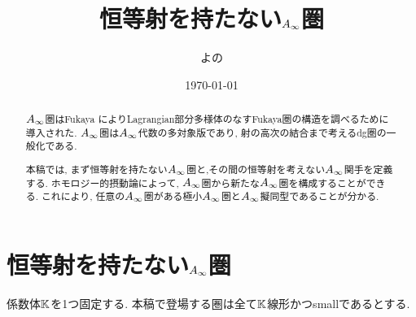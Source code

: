 \documentclass[uplatex, a4paper, 14Q, dvipdfmx]{jsarticle}
\title{恒等射を持たない\texorpdfstring{$A_{\infty}$}{Ainf}圏}
\author{よの}
\date{\today}
\begin{document}
\maketitle

\begin{abstract}
  $A_{\infty}$圏はFukaya \cite{Fuk93}\cite{Fuk96}によりLagrangian部分多様体のなすFukaya圏の構造を調べるために導入された. 
  $A_{\infty}$圏は$A_{\infty}$代数の多対象版であり, 射の高次の結合まで考えるdg圏の一般化である. 




  本稿では, まず恒等射を持たない$A_{\infty}$圏と,その間の恒等射を考えない$A_{\infty}$関手を定義する. 
  ホモロジー的摂動論によって, $A_{\infty}$圏から新たな$A_{\infty}$圏を構成することができる. 
  これにより, 任意の$A_{\infty}$圏がある極小$A_{\infty}$圏と$A_{\infty}$擬同型であることが分かる. 

\end{abstract}

\tableofcontents

\section{恒等射を持たない\texorpdfstring{$A_{\infty}$}{Ainf}圏} \label{section_non_unital_Ainf_cat}

係数体$\mathbb{K}$を1つ固定する. 
本稿で登場する圏は全て$\mathbb{K}$線形かつsmallであるとする. 
\end{document}
